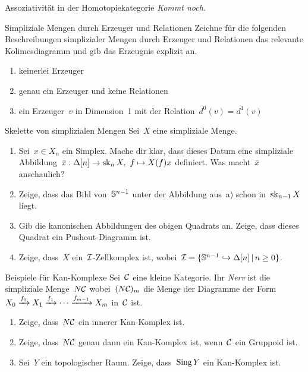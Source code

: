 \documentclass{uebblatt}
\begin{document}

\begin{aufgabe}{Assoziativität in der Homotopiekategorie}
\emph{Kommt noch.}
\end{aufgabe}

\begin{aufgabe}{Simpliziale Mengen durch Erzeuger und Relationen}
Zeichne für die folgenden Beschreibungen simplizialer Mengen durch Erzeuger und
Relationen das relevante Kolimesdiagramm und gib das Erzeugnis explizit an.
\begin{enumerate}
\item keinerlei Erzeuger
\item genau ein Erzeuger und keine Relationen
\item ein Erzeuger~$v$ in Dimension~1 mit der Relation~$d^0(v) = d^1(v)$
\end{enumerate}
\end{aufgabe}

\begin{aufgabe}{Skelette von simplizialen Mengen}
Sei~$X$ eine simpliziale Menge.

\begin{enumerate}
\item Sei~$x \in X_n$ ein Simplex. Mache dir
klar, dass dieses Datum eine simpliziale Abbildung~$\bar x : \Delta[n] \to \operatorname{sk}_n
X,\ f \mapsto X(f)x$ definiert. Was macht~$\bar x$ anschaulich?
\item Zeige, dass das Bild von~$\mathbb{S}^{n-1}$ unter der Abbildung
aus~a) schon in~$\operatorname{sk}_{n-1} X$ liegt.
\item Gib die kanonischen Abbildungen des obigen Quadrats an.
Zeige, dass dieses Quadrat ein Pushout-Diagramm ist.
\item Zeige, dass~$X$ ein~$\mathcal{I}$-Zellkomplex ist, wobei~$\mathcal{I} = \{ \mathbb{S}^{n-1}
\hookrightarrow \Delta[n] \,|\, n \geq 0 \}$.
\end{enumerate}
\end{aufgabe}

\begin{aufgabe}{Beispiele für Kan-Komplexe}
Sei~$\mathcal{C}$ eine kleine Kategorie. Ihr \emph{Nerv} ist die simpliziale Menge~$N\mathcal{C}$
wobei~$(N\mathcal{C})_m$ die Menge der Diagramme der Form $X_0 \xrightarrow{f_0} X_1 \xrightarrow{f_1}
\cdots \xrightarrow{f_{m-1}} X_m$ in~$\mathcal{C}$ ist.
\begin{enumerate}
\item Zeige, dass~$N\mathcal{C}$ ein innerer Kan-Komplex ist.
\item Zeige, dass~$N\mathcal{C}$ genau dann ein Kan-Komplex ist, wenn~$\mathcal{C}$ ein Gruppoid
ist.
\item Sei~$Y$ ein topologischer Raum. Zeige, dass~$\operatorname{Sing} Y$ ein Kan-Komplex
ist.
\end{enumerate}
\end{aufgabe}
\end{document}
